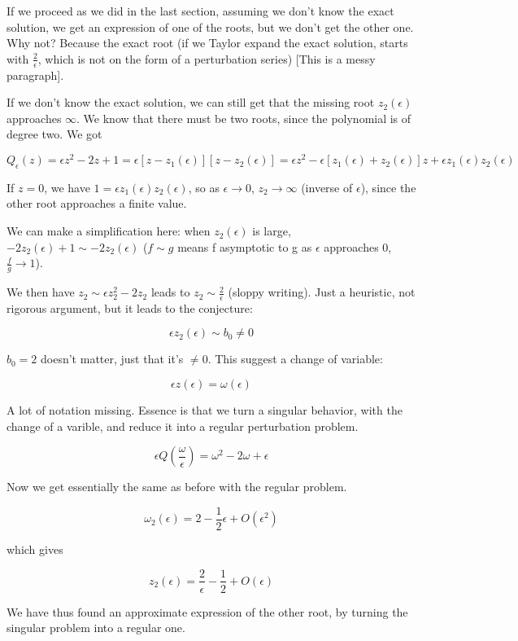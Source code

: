 \documentclass[12pt]{report}
\begin{document}
If we proceed as we did in the last section, assuming we don't know the exact
solution, we get an expression of one of the roots, but we don't get the other
one. Why not? Because the exact root (if we Taylor expand the exact solution,
starts with $\frac 2 \epsilon$, which is not on the form of a perturbation
series) [This is a messy paragraph].

If we don't know the exact solution, we can still get that the missing root
$z_2(\epsilon)$ approaches $\infty$. We know that there must be two roots, since
the polynomial is of degree two. We got

$$Q_\epsilon(z) = \epsilon z^2 - 2z +1 = \epsilon[z - z_1(\epsilon)][z -
z_2(\epsilon)] = \epsilon z^2 - \epsilon [z_1(\epsilon) + z_2(\epsilon)]z +
\epsilon z_1(\epsilon)z_2(\epsilon)$$

If $z=0$, we have $1 = \epsilon z_1(\epsilon) z_2(\epsilon)$, so as $\epsilon
\to 0$, $z_2 \to \infty$ (inverse of $\epsilon$), since the other root approaches a finite value.

We can make a simplification here: when $z_2(\epsilon)$ is large, $-2
z_2(\epsilon) + 1 \sim -2 z_2(\epsilon)$ ($f \sim g$ means f asymptotic to g as
$\epsilon$ approaches 0, $\frac f g \to 1$).

We then have $z_2 \sim \epsilon z_2^2 - 2 z_2$ leads to $z_2 \sim \frac 2 \epsilon$
(sloppy writing). Just a heuristic, not rigorous argument, but it leads to the
conjecture:

$$\epsilon z_2(\epsilon) \sim b_0 \neq 0$$

$b_0 = 2$ doesn't matter, just that it's $\neq 0$. This suggest a change of
variable:

$$\epsilon z (\epsilon) = \omega (\epsilon)$$

A lot of notation missing. Essence is that we turn a singular behavior, with the
change of a varible, and reduce it into a regular perturbation problem.

$$\epsilon Q(\frac \omega \epsilon) = \omega^2 - 2\omega + \epsilon$$

Now we get essentially the same as before with the regular problem.

$$\omega_2(\epsilon) = 2 - \frac 1 2 \epsilon + O(\epsilon^2)$$

which gives

$$z_2(\epsilon) = \frac 2 \epsilon - \frac 1 2 + O(\epsilon)$$

We have thus found an approximate expression of the other root, by turning the
singular problem into a regular one.
\end{document}
